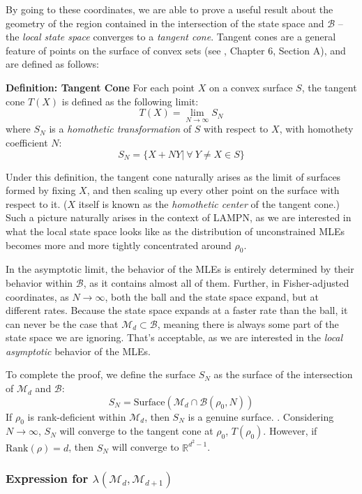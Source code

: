 \documentclass[aps,pra, twocolumn]{revtex4-1}
\newcommand{\M}{\mathcal{M}}
\begin{document}
By going to these coordinates, we are able to prove a useful result about the geometry of the region contained in the intersection of the state space and $\mathcal{B}$ --  the \emph{local state space} converges to a \emph{tangent cone}. Tangent cones are a general feature of points on the surface of convex sets (see \cite{Rockafellar1998}, Chapter 6, Section A), and are defined as follows:

\textbf{Definition: Tangent Cone} 
For each point $X$ on a convex surface $S$, the tangent cone $T(X)$ is defined as the following limit:
\[T(X) = \lim_{N\rightarrow \infty} S_{N}\]
where $S_{N}$ is a \emph{homothetic transformation} of $S$ with respect to $X$, with homothety coefficient $N$:
\[S_{N} = \{X + NY  |~\forall ~Y \neq X \in S\}\]

Under this definition, the tangent cone naturally arises as the limit of surfaces formed by fixing $X$, and then scaling up every other point on the surface with respect to it. ($X$ itself is known as the \emph{homothetic center} of the tangent cone.) Such a picture naturally arises in the context of LAMPN, as we are interested in what the local state space looks like as the distribution of unconstrained MLEs becomes more and more tightly concentrated around $\rho_{0}$.

In the asymptotic limit, the behavior of the MLEs is entirely determined by their behavior within $\mathcal{B}$, as it contains almost all of them. Further, in Fisher-adjusted coordinates, as $N\rightarrow \infty$, both the ball and the state space expand, but at different rates. Because the state space expands at a faster rate than the ball, it can never be the case that $\M_{d}\subset \mathcal{B}$, meaning there is always some part of the state space we are ignoring. That's acceptable, as we are interested in the \emph{local asymptotic} behavior of the MLEs.

To complete the proof, we define the surface $S_{N}$ as the surface of the intersection of $\M_{d}$ and $\mathcal{B}$:
\[S_{N} = \text{Surface}(\M_{d} \cap \mathcal{B}(\rho_{0}, N))\]
If $\rho_{0}$ is rank-deficient within $\M_{d}$, then $S_{N}$ is a genuine surface. . Considering $N \rightarrow \infty$, $S_{N}$ will converge to the tangent cone at $\rho_{0}$, $T(\rho_{0})$. However, if $\mathrm{Rank}(\rho)  = d$, then $S_{N}$ will converge to $\mathbb{R}^{d^{2}-1}$.

\subsubsection{Expression for $\lambda(\M_{d}, \M_{d+1})$}
\end{document}
